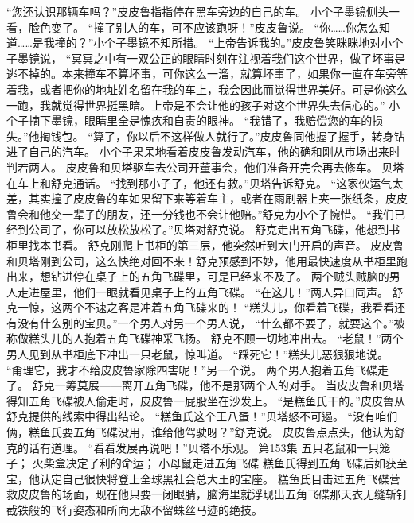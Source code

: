 \documentclass[a4paper,12pt,UTF8,twoside]{ctexbook}
\begin{document}
        “您还认识那辆车吗？”皮皮鲁指指停在黑车旁边的自己的车。 
        小个子墨镜侧头一看，脸色变了。 
        “撞了别人的车，可不应该跑呀！”皮皮鲁说。 
        “你……你怎么知道……是我撞的？”小个子墨镜不知所措。 
        “上帝告诉我的。”皮皮鲁笑眯眯地对小个子墨镜说，  “冥冥之中有一双公正的眼睛时刻在注视着我们这个世界，做了坏事是逃不掉的。本来撞车不算坏事，可你这么一溜，就算坏事了，如果你一直在车旁等着我，或者把你的地址姓名留在我的车上，我会因此而觉得世界美好。可是你这么一跑，我就觉得世界挺黑暗。上帝是不会让他的孩子对这个世界失去信心的。” 
        小个子摘下墨镜，眼睛里全是愧疚和自责的眼神。 
        “我错了，我赔偿您的车的损失。”他掏钱包。 
        “算了，你以后不这样做人就行了。”皮皮鲁同他握了握手，转身钻进了自己的汽车。 
        小个子果呆地看着皮皮鲁发动汽车，他的确和刚从市场出来时判若两人。 
        皮皮鲁和贝塔驱车去公司开董事会，他们准备开完会再去修车。 
        贝塔在车上和舒克通话。 
        “找到那小子了，他还有救。”贝塔告诉舒克。 
        “这家伙运气太差，其实撞了皮皮鲁的车如果留下来等着车主，或者在雨刷器上夹一张纸条，皮皮鲁会和他交一辈子的朋友，还一分钱也不会让他赔。”舒克为小个子惋惜。 
        “我们已经到公司了，你可以放松放松了。”贝塔对舒克说。 
        舒克走出五角飞碟，他想到书柜里找本书看。 
        舒克刚爬上书柜的第三层，他突然听到大门开启的声音。 
        皮皮鲁和贝塔刚到公司，这么快绝对回不来！舒克预感到不妙，他用最快速度从书柜里跑出来，想钻进停在桌子上的五角飞碟里，可是已经来不及了。 
        两个贼头贼脑的男人走进屋里，他们一眼就看见桌子上的五角飞碟。 
        “在这儿！”两人异口同声。 
        舒克一惊，这两个不速之客是冲着五角飞碟来的！ 
        “糕头儿，你看着飞碟，我看看还有没有什么别的宝贝。”一个男人对另一个男人说， 
        “什么都不要了，就要这个。”被称做糕头儿的人抱着五角飞碟神采飞扬。 
        舒克不顾一切地冲出去。 
        “老鼠！”两个男人见到从书柜底下冲出一只老鼠，惊叫道。 
        “踩死它！”糕头儿恶狠狠地说。 
        “甭理它，我才不给皮皮鲁家除四害呢！”另一个说。 
        两个男人抱着五角飞碟走了。 
        舒克一筹莫展——离开五角飞碟，他不是那两个人的对手。 
        当皮皮鲁和贝塔得知五角飞碟被人偷走时，皮皮鲁一屁股坐在沙发上。 
        “是糕鱼氏干的。”皮皮鲁从舒克提供的线索中得出结论。 
        “糕鱼氏这个王八蛋！”贝塔怒不可遏。 
        “没有咱们俩，糕鱼氏要五角飞碟没用，谁给他驾驶呀？”舒克说。 
        皮皮鲁点点头，他认为舒克的话有道理。 
        “看看发展再说吧！”贝塔不乐观。   第153集 
        五只老鼠和一只笼子； 
        火柴盒决定了利的命运； 
        小母鼠走进五角飞碟   
        糕鱼氏得到五角飞碟后如获至宝，他认定自己很快将登上全球黑社会总大王的宝座。 
        糕鱼氏目击过五角飞碟营救皮皮鲁的场面，现在他只要一闭眼腈，脑海里就浮现出五角飞碟那天衣无缝斩钉截铁般的飞行姿态和所向无敌不留蛛丝马迹的绝技。 
\end{document}
